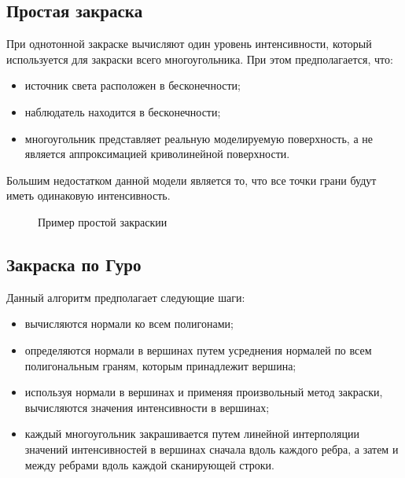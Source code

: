\subsection{Простая закраска}

При однотонной закраске вычисляют один уровень интенсивности, который используется для закраски всего многоугольника. При этом предполагается, что:
\begin{itemize}
	\item источник света расположен в бесконечности;
	\item наблюдатель находится в бесконечности;
	\item многоугольник представляет реальную моделируемую поверхность, а не является аппроксимацией криволинейной поверхности.
\end{itemize}

Большим недостатком данной модели является то, что все точки грани будут иметь одинаковую интенсивность.

\begin{figure}[ph!]
	\caption{Пример простой закраскии}
	\label{fig:draw_simple}
\end{figure}

\clearpage

\subsection{Закраска по Гуро}

Данный алгоритм предполагает следующие шаги:
\begin{itemize}
	\item вычисляются нормали ко всем полигонами;
	\item определяются нормали в вершинах путем усреднения нормалей по всем полигональным граням, которым принадлежит вершина;
	\item используя нормали в вершинах и применяя произвольный метод закраски, вычисляются значения интенсивности в вершинах;
	\item каждый многоугольник закрашивается путем линейной интерполяции значений интенсивностей в вершинах сначала вдоль каждого ребра, а затем и между ребрами вдоль каждой сканирующей строки.
\end{itemize}

